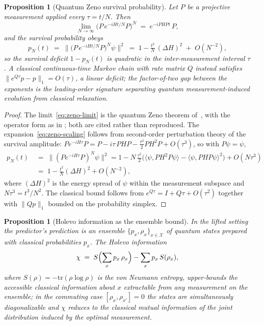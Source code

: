 \documentclass[11pt,a4paper]{article}
\theoremstyle{plain}
\newtheorem{proposition}[theorem]{Proposition}
\theoremstyle{definition}
\theoremstyle{remark}
\begin{document}
\begin{proposition}[Quantum Zeno survival probability]
\label{prop:zeno-survival}
Let $P$ be a projective measurement applied every $\tau=t/N$.
Then
\begin{equation}\label{eq:zeno-limit}
  \lim_{N\to\infty}\bigl(P\,e^{-iHt/N}P\bigr)^{N} \;=\;
  e^{-iPHPt}\,P,
\end{equation}
and the survival probability obeys
\begin{equation}\label{eq:zeno-scaling}
  p_N(t) \;=\; \bigl\lVert\bigl(P\,e^{-iHt/N}P\bigr)^{N}\psi
  \bigr\rVert^{2} \;=\; 1-\tfrac{t^{2}}{N}\,(\Delta H)^{2} \;+\;
  O(N^{-2}),
\end{equation}
so the survival deficit $1-p_N(t)$ is quadratic in the
inter-measurement interval $\tau$. A classical continuous-time
Markov chain with rate matrix $Q$ instead satisfies
$\lVert e^{Q\tau}p-p\rVert_{1}=O(\tau)$, a linear deficit; the
factor-of-two gap between the exponents is the leading-order
signature separating quantum measurement-induced evolution from
classical relaxation.
\end{proposition}

\begin{proof}
The limit~\eqref{eq:zeno-limit} is the quantum Zeno theorem
of~\cite{misra1977}, with the operator form as in
\cite{facchi2008}; both are cited rather than reproduced. The
expansion~\eqref{eq:zeno-scaling} follows from second-order
perturbation theory of the survival amplitude:
$Pe^{-iH\tau}P=P-i\tau\,PHP-\tfrac{\tau^{2}}{2}PH^{2}P+O(\tau^{3})
$, so with $P\psi=\psi$,
\[
\begin{aligned}
  p_N(t) &\;=\; \bigl\lVert(Pe^{-iH\tau}P)^{N}\psi\bigr\rVert^{2}
  = 1-N\,\tfrac{\tau^{2}}{2}\bigl(\langle\psi,PH^{2}P\psi
  \rangle-\langle\psi,PHP\psi\rangle^{2}\bigr)+O(N\tau^{3})\\[2pt]
  &\;=\; 1-\tfrac{t^{2}}{N}(\Delta H)^{2}+O(N^{-2}),
\end{aligned}
\]
where $(\Delta H)^{2}$ is the energy spread of $\psi$ within the
measurement subspace and $N\tau^{3}=t^{3}/N^{2}$. The classical
bound follows from $e^{Q\tau}=I+Q\tau+O(\tau^{2})$ together with
$\lVert Qp\rVert_{1}$ bounded on the probability simplex.
\end{proof}

\begin{proposition}[Holevo information as the ensemble bound]
\label{prop:holevo}
In the lifted setting the predictor's prediction is an ensemble
$\{p_x,\rho_x\}_{x\in\mathcal X}$ of quantum states prepared with
classical probabilities $p_x$. The Holevo
information~\cite{holevo1973}
\begin{equation}\label{eq:holevo}
  \chi \;=\; S\Bigl(\sum_x p_x\,\rho_x\Bigr)-\sum_x p_x\,S(\rho_x),
\end{equation}
where $S(\rho)=-\mathrm{tr}(\rho\log\rho)$ is the von Neumann
entropy, upper-bounds the accessible classical information about
$x$ extractable from any measurement on the ensemble; in the
commuting case $[\rho_x,\rho_{x'}]=0$ the states are simultaneously
diagonalizable and $\chi$ reduces to the classical mutual
information of the joint distribution induced by the optimal
measurement.
\end{proposition}
\end{document}
